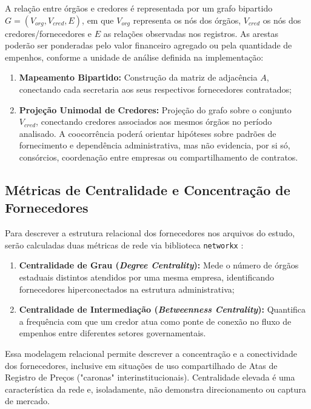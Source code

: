 \documentclass[
    12pt,               %
    openright,          %
    oneside,            %
    a4paper,            %
    chapter=TITLE,      %
    sumario=tradicional,%
    english,            %
    brazilian,          %
 ]{abntex2}
\begin{document}
A relação entre órgãos e credores é representada por um grafo bipartido $G = (V_{org}, V_{cred}, E)$, em que $V_{org}$ representa os nós dos órgãos, $V_{cred}$ os nós dos credores/fornecedores e $E$ as relações observadas nos registros. As arestas poderão ser ponderadas pelo valor financeiro agregado ou pela quantidade de empenhos, conforme a unidade de análise definida na implementação:

\begin{enumerate}
    \item \textbf{Mapeamento Bipartido:} Construção da matriz de adjacência $A$, conectando cada secretaria aos seus respectivos fornecedores contratados;
    \item \textbf{Projeção Unimodal de Credores:} Projeção do grafo sobre o conjunto $V_{cred}$, conectando credores associados aos mesmos órgãos no período analisado. A coocorrência poderá orientar hipóteses sobre padrões de fornecimento e dependência administrativa, mas não evidencia, por si só, consórcios, coordenação entre empresas ou compartilhamento de contratos.
\end{enumerate}

\subsection{Métricas de Centralidade e Concentração de Fornecedores}\label{subsec:metricas_centralidade}

Para descrever a estrutura relacional dos fornecedores nos arquivos do estudo, serão calculadas duas métricas de rede via biblioteca \texttt{networkx} \cite{nunes2021}:

\begin{enumerate}
    \item \textbf{Centralidade de Grau (\textit{Degree Centrality}):} Mede o número de órgãos estaduais distintos atendidos por uma mesma empresa, identificando fornecedores hiperconectados na estrutura administrativa;
    \item \textbf{Centralidade de Intermediação (\textit{Betweenness Centrality}):} Quantifica a frequência com que um credor atua como ponte de conexão no fluxo de empenhos entre diferentes setores governamentais.
\end{enumerate}

Essa modelagem relacional permite descrever a concentração e a conectividade dos fornecedores, inclusive em situações de uso compartilhado de Atas de Registro de Preços ("caronas" interinstitucionais). Centralidade elevada é uma característica da rede e, isoladamente, não demonstra direcionamento ou captura de mercado.
\end{document}
